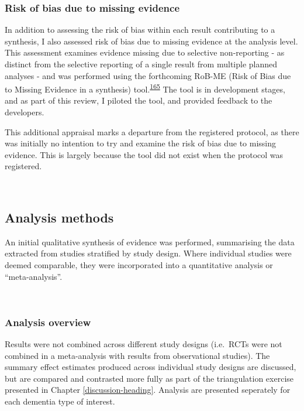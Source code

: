 \documentclass[a4paper, twoside]{templates/ociamthesis}
\begin{document}
\hypertarget{methods-rob-me}{%
\subsubsection{Risk of bias due to missing evidence}\label{methods-rob-me}}

In addition to assessing the risk of bias within each result contributing to a synthesis, I also assessed risk of bias due to missing evidence at the analysis level. This assessment examines evidence missing due to selective non-reporting - as distinct from the selective reporting of a single result from multiple planned analyses - and was performed using the forthcoming RoB-ME (Risk of Bias due to Missing Evidence in a synthesis) tool.\textsuperscript{\protect\hyperlink{ref-zotero-15123}{165}} The tool is in development stages, and as part of this review, I piloted the tool, and provided feedback to the developers.

This additional appraisal marks a departure from the registered protocol, as there was initially no intention to try and examine the risk of bias due to missing evidence. This is largely because the tool did not exist when the protocol was registered.

~

\hypertarget{analysis-methods}{%
\subsection{Analysis methods}\label{analysis-methods}}

An initial qualitative synthesis of evidence was performed, summarising the data extracted from studies stratified by study design. Where individual studies were deemed comparable, they were incorporated into a quantitative analysis or ``meta-analysis''.

~

\hypertarget{analysis-overview}{%
\subsubsection{Analysis overview}\label{analysis-overview}}

Results were not combined across different study designs (i.e.~RCTs were not combined in a meta-analysis with results from observational studies). The summary effect estimates produced across individual study designs are discussed, but are compared and contrasted more fully as part of the triangulation exercise presented in Chapter \ref{discussion-heading}. Analysis are presented seperately for each dementia type of interest.
\end{document}
